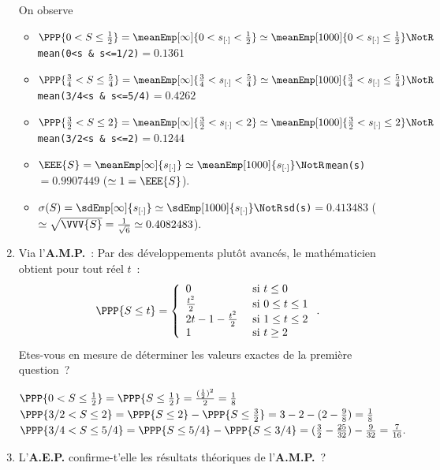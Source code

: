\documentclass[10pt]{report}
\begin{document}
\begin{exercice}
\begin{enumerate}
\begin{Correction}
On observe
\begin{itemize}
\item $\PPP{0<S\leq\frac12}=\meanEmp[\infty]{0<s_{[\cdot]}<\frac12}\simeq\meanEmp[1000]{0<s_{[\cdot]}\leq\frac12}\NotR$ \verb!mean(0<s & s<=1/2)!$=0.1361$
 \item $\PPP{\frac34<S\leq\frac54}=\meanEmp[\infty]{\frac34<s_{[\cdot]}<\frac54}\simeq\meanEmp[1000]{\frac34<s_{[\cdot]}\leq\frac54}\NotR$ \verb!mean(3/4<s & s<=5/4)!$=0.4262$
\item $\PPP{\frac32<S\leq2}=\meanEmp[\infty]{\frac32<s_{[\cdot]}<2}\simeq\meanEmp[1000]{\frac32<s_{[\cdot]}\leq2}\NotR$ \verb!mean(3/2<s & s<=2)!$=0.1244$
\item $\EEE{S}=\meanEmp[\infty]{s_{[\cdot]}}\simeq\meanEmp[1000]{s_{[\cdot]}}\NotR$\verb!mean(s)!$=0.9907449$ ($\simeq 1=\EEE{S}$).
\item $\sigma(S)=\sdEmp[\infty]{s_{[\cdot]}}\simeq\sdEmp[1000]{s_{[\cdot]}}\NotR$\verb!sd(s)!$=0.413483$ ($\simeq \sqrt{\VVV{S}}=\frac1{\sqrt6}\simeq0.4082483$).
\end{itemize}
\end{Correction}

\item Via l'\textbf{A.M.P.}~: Par des développements plutôt avancés, le mathématicien obtient pour tout réel $t$~: 
$$
\PPP{S\leq t}= \left\{ \begin{array}{ll}
0 & \mbox{ si } t\leq 0 \\
\frac{t^2}2 & \mbox{ si } 0\leq t\leq 1 \\
2t-1-\frac{t^2}2& \mbox{ si } 1\leq t \leq 2 \\
1 & \mbox{ si } t\geq 2 
\end{array} \right..
$$ Etes-vous en mesure de déterminer les valeurs exactes de la première question~?

\begin{Correction}
$\PPP{0<S\leq\frac12}= \PPP{S\leq \frac12}= \frac{(\frac12)^2}2 = \frac18$ \\
$\PPP{3/2<S\leq2}= \PPP{S\leq 2} - \PPP{S\leq \frac32}= 3 - 2 - (2 - \frac98)= \frac18$\\
$\PPP{3/4<S\leq5/4}= \PPP{S\leq 5/4} - \PPP{S\leq 3/4}= (\frac32-\frac{25}{32}) -\frac9{32}=\frac{7}{16}.$ 
\end{Correction}

\item L'\textbf{A.E.P.} confirme-t'elle les résultats théoriques de l'\textbf{A.M.P.}~? 

\end{enumerate}
\end{exercice}
\end{document}

